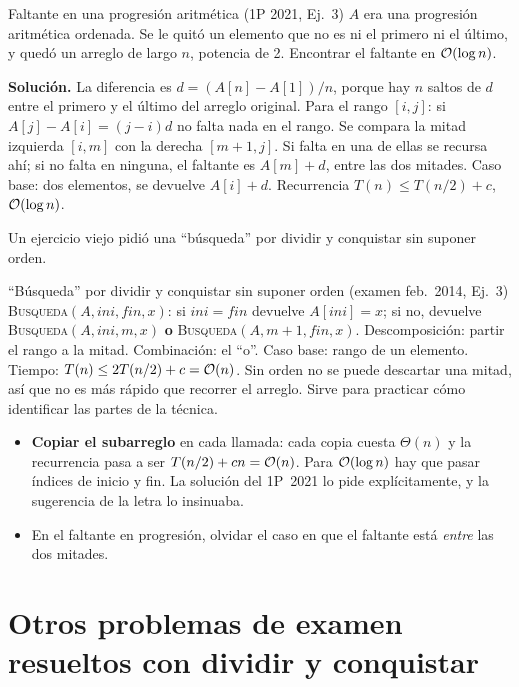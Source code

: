 \begin{problema}{Faltante en una progresión aritmética (1P 2021, Ej.~3)}
$A$ era una progresión aritmética ordenada. Se le quitó un elemento que no es ni el primero ni el último, y quedó un arreglo de largo $n$, potencia de 2. Encontrar el faltante en $\mathcal{O}(\log n)$.

\textbf{Solución.} La diferencia es $d=(A[n]-A[1])/n$, porque hay $n$ saltos de $d$ entre el primero y el último del arreglo original. Para el rango $[i,j]$: si $A[j]-A[i]=(j-i)d$ no falta nada en el rango. Se compara la mitad izquierda $[i,m]$ con la derecha $[m+1,j]$. Si falta en una de ellas se recursa ahí; si no falta en ninguna, el faltante es $A[m]+d$, entre las dos mitades. Caso base: dos elementos, se devuelve $A[i]+d$. Recurrencia $T(n)\le T(n/2)+c$, $\mathcal{O}(\log n)$.
\end{problema}

Un ejercicio viejo pidió una ``búsqueda'' por dividir y conquistar sin suponer orden.

\begin{problema}{``Búsqueda'' por dividir y conquistar sin suponer orden (examen feb.~2014, Ej.~3)}
\textsc{Busqueda}$(A,ini,fin,x)$: si $ini=fin$ devuelve $A[ini]=x$; si no, devuelve \textsc{Busqueda}$(A,ini,m,x)$ \textbf{o} \textsc{Busqueda}$(A,m+1,fin,x)$. Descomposición: partir el rango a la mitad. Combinación: el ``o''. Caso base: rango de un elemento. Tiempo: $T(n)\le 2T(n/2)+c=\mathcal{O}(n)$. Sin orden no se puede descartar una mitad, así que no es más rápido que recorrer el arreglo. Sirve para practicar cómo identificar las partes de la técnica.
\end{problema}

\begin{trampa}
\begin{itemize}
  \item \textbf{Copiar el subarreglo} en cada llamada: cada copia cuesta $\Theta(n)$ y la recurrencia pasa a ser $T(n/2)+cn=\mathcal{O}(n)$. Para $\mathcal{O}(\log n)$ hay que pasar índices de inicio y fin. La solución del 1P~2021 lo pide explícitamente, y la sugerencia de la letra lo insinuaba.
  \item En el faltante en progresión, olvidar el caso en que el faltante está \emph{entre} las dos mitades.
\end{itemize}
\end{trampa}

\section{Otros problemas de examen resueltos con dividir y conquistar}

